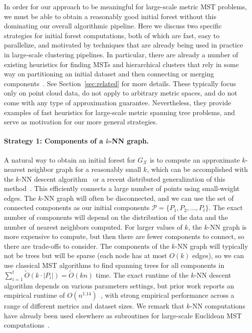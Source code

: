 In order for our approach to be meaningful for large-scale metric MST problems, we must be able to obtain a reasonably good initial forest without this dominating our overall algorithmic pipeline.
Here we discuss two specific strategies for initial forest computations, both of which are fast, easy to parallelize, and motivated by techniques that are already being used in practice in large-scale clustering pipelines. In particular, there are already a number of existing heuristics for finding MSTs and hierarchical clusters that rely in some way on partitioning an initial dataset and then connecting or merging components~\cite{zhong2015fast,jothi2018fast,mishra2020efficient,chen2013clustering}. See Section~\ref{sec:related} for more details. These typically focus only on point cloud data, do not apply to arbitrary metric spaces, and do not come with any type of approximation guarantee. Nevertheless, they provide examples of fast heuristics for large-scale metric spanning tree problems, and serve as motivation for our more general strategies.

\paragraph{Strategy 1: Components of a $k$-NN graph.}
A natural way to obtain an initial forest for $G_\mathcal{X}$ is to compute an approximate $k$-nearest neighbor graph for a reasonably small $k$, which can be accomplished with the $k$-NN descent algorithm~\cite{dong2011efficient} or a recent distributed generalization of this method~\cite{iwabuchi2023towards}. This efficiently connects a large number of points using small-weight edges. The $k$-NN graph will often be disconnected, and we can use the set of connected components as our initial components $\mathcal{P} = \{P_1, P_2, \hdots , P_t\}$. The exact number of components will depend on the distribution of the data and the number of nearest neighbors computed. For larger values of $k$, the $k$-NN graph is more expensive to compute, but then there are fewer components to connect, so there are trade-offs to consider. The components of the $k$-NN graph will typically not be trees but will be sparse (each node has at most $O(k)$ edges), so we can use classical MST algorithms to find spanning trees for all components in $\sum_{i = 1}^t \tilde{O}(k \cdot |P_i|) = \tilde{O}(kn)$ time. The exact runtime of the $k$-NN descent algorithm depends on various parameters settings, but prior work reports an empirical runtime of $O(n^{1.14})$~\cite{dong2011efficient}, with strong empirical performance across a range of different metrics and dataset sizes. We remark that $k$-NN computations have already been used elsewhere as subroutines for large-scale Euclidean MST computations~\cite{almansoori2024fast,chen2013clustering}.

